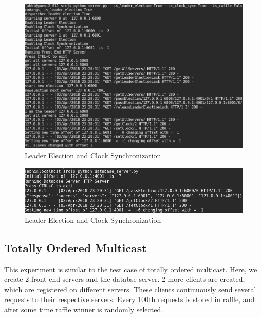 \documentclass{article}
\begin{document}
\begin{figure}[H]
        \centering
        \includegraphics[width=\textwidth]{outputs/clock_sync_server.png}
        \caption{Leader Election and Clock Synchronization \label{fig:clong_synchronization}}
\end{figure}
\begin{figure}[H]
        \centering
        \includegraphics[width=\textwidth]{outputs/clock_sync_db.png}
        \caption{Leader Election and Clock Synchronization \label{fig:clong_synchronization}}
\end{figure}
\subsection{Totally Ordered Multicast}
This experiment is similar to the test case of totally ordered multicast.
Here, we create 2 front end servers and the databse server. 2 more clients
are created, which are registered on different servers. These clients
continuously send several requests to their respective servers.
Every 100th requests is stored in raffle, and after some time raffle 
winner is randomly selected.
\end{document}
